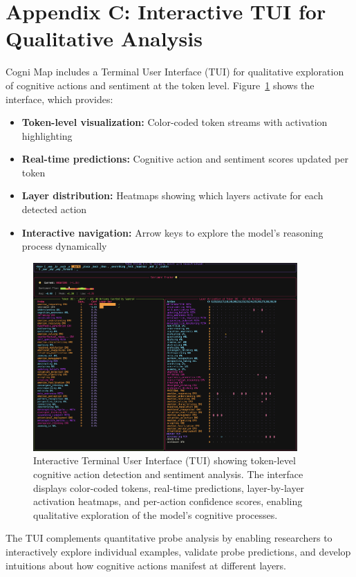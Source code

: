 \documentclass[letterpaper]{article}
\begin{document}
\section{Appendix C: Interactive TUI for Qualitative Analysis}

Cogni Map includes a Terminal User Interface (TUI) for qualitative exploration of cognitive actions and sentiment at the token level. Figure~\ref{fig:tui} shows the interface, which provides:

\begin{itemize}
    \item \textbf{Token-level visualization:} Color-coded token streams with activation highlighting
    \item \textbf{Real-time predictions:} Cognitive action and sentiment scores updated per token
    \item \textbf{Layer distribution:} Heatmaps showing which layers activate for each detected action
    \item \textbf{Interactive navigation:} Arrow keys to explore the model's reasoning process dynamically
\end{itemize}

\begin{figure}[t]
\centering
\includegraphics[width=0.9\textwidth]{../data/TUI_example.png}
\caption{Interactive Terminal User Interface (TUI) showing token-level cognitive action detection and sentiment analysis. The interface displays color-coded tokens, real-time predictions, layer-by-layer activation heatmaps, and per-action confidence scores, enabling qualitative exploration of the model's cognitive processes.}
\label{fig:tui}
\end{figure}

The TUI complements quantitative probe analysis by enabling researchers to interactively explore individual examples, validate probe predictions, and develop intuitions about how cognitive actions manifest at different layers.
\end{document}
